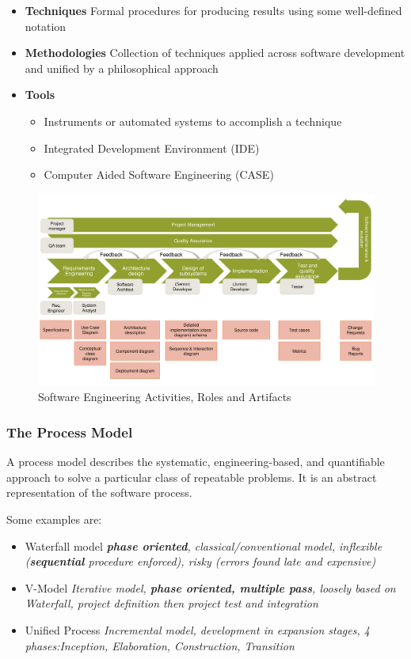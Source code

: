 \begin{itemize}
    \item \textbf{Techniques} Formal procedures for producing results using some well-defined notation
    \item \textbf{Methodologies} Collection of techniques applied across software development and unified by a philosophical approach
    \item \textbf{Tools}
        \begin{itemize}[topsep=-5pt, itemsep=0pt]
            \item Instruments or automated systems to accomplish a technique
            \item Integrated Development Environment (IDE)
            \item Computer Aided Software Engineering (CASE)
        \end{itemize}
\end{itemize}

\begin{figure}[h]
    \centering
    \includegraphics[width=\linewidth]{images/se_activities_roles_artifacts.png}
    \caption{Software Engineering Activities, Roles and Artifacts}\label{fig:se_activities_roles_artifacts}
\end{figure}

\subsubsection{The Process Model}
A process model describes the systematic, engineering-based, and quantifiable approach to solve a particular class of repeatable problems.
It is an abstract representation of the software process.

Some examples are:
\begin{itemize}
    \item Waterfall model \textit{\textbf{phase oriented}, classical/conventional model, inflexible (\textbf{sequential} procedure enforced), risky (errors found late and expensive)}
    \item V-Model \textit{Iterative model, \textbf{phase oriented, multiple pass}, loosely based on Waterfall, project definition then project test and integration}
    \item Unified Process \textit{Incremental model, development in expansion stages, 4 phases:Inception, Elaboration, Construction, Transition}
\end{itemize}

